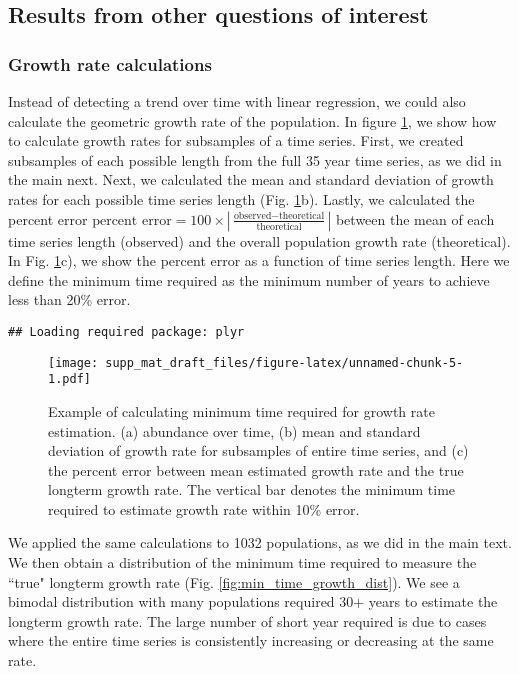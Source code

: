 \documentclass[12pt,]{article}
\begin{document}
\pagebreak

\subsection{Results from other questions of
interest}\label{results-from-other-questions-of-interest}

\subsubsection{Growth rate calculations}\label{growth-rate-calculations}

Instead of detecting a trend over time with linear regression, we could
also calculate the geometric growth rate of the population. In figure
\ref{fig:growth_rate}, we show how to calculate growth rates for
subsamples of a time series. First, we created subsamples of each
possible length from the full 35 year time series, as we did in the main
next. Next, we calculated the mean and standard deviation of growth
rates for each possible time series length (Fig.
\ref{fig:growth_rate}b). Lastly, we calculated the percent error
\(\mbox{percent error} = 100 \times \left| \frac{\mbox{observed} - \mbox{theoretical}}{\mbox{theoretical}} \right|\)
between the mean of each time series length (observed) and the overall
population growth rate (theoretical). In Fig. \ref{fig:growth_rate}c),
we show the percent error as a function of time series length. Here we
define the minimum time required as the minimum number of years to
achieve less than 20\% error.

\begin{verbatim}
## Loading required package: plyr
\end{verbatim}

\begin{figure}[htbp]
\centering
\texttt{[image: supp\_mat\_draft\_files/figure-latex/unnamed-chunk-5-1.pdf]}
\caption{Example of calculating minimum time required for growth rate
estimation. (a) abundance over time, (b) mean and standard deviation of
growth rate for subsamples of entire time series, and (c) the percent
error between mean estimated growth rate and the true longterm growth
rate. The vertical bar denotes the minimum time required to estimate
growth rate within 10\% error.\label{fig:growth_rate}}
\end{figure}

We applied the same calculations to 1032 populations, as we did in the
main text. We then obtain a distribution of the minimum time required to
measure the ``true" longterm growth rate (Fig.
\ref{fig:min_time_growth_dist}). We see a bimodal distribution with many
populations required 30+ years to estimate the longterm growth rate. The
large number of short year required is due to cases where the entire
time series is consistently increasing or decreasing at the same rate.
\end{document}
